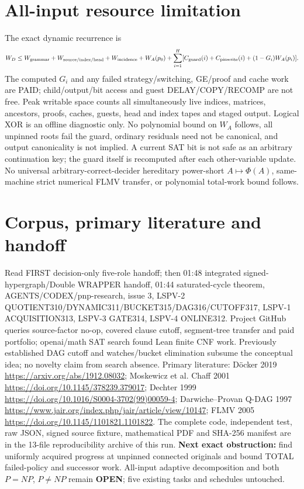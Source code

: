 \documentclass[11pt]{article}
\begin{document}
\section{All-input resource limitation}
The exact dynamic recurrence is
\[
W_D\le W_{\rm grammar}+W_{\rm source/index/head}+W_{\rm incidence}+W_A(p_0)
+\sum_{i=1}^{H}[C_{\rm guard}(i)+C_{\rm pinwrite}(i)+(1-G_i)W_A(p_i)].
\]
The computed $G_i$ and any failed strategy/switching, GE/proof and cache work are PAID; child/output/bit access and guest DELAY/COPY/RECOMP are not free. Peak writable space counts all simultaneously live indices, matrices, ancestors, proofs, caches, guests, head and index tapes and staged output. Logical XOR is an offline diagnostic only. No polynomial bound on $W_A$ follows, all unpinned roots fail the guard, ordinary residuals need not be canonical, and output canonicality is not implied. A current SAT bit is not safe as an arbitrary continuation key; the guard itself is recomputed after each other-variable update. No universal arbitrary-correct-decider hereditary power-short $A\mapsto\Phi(A)$, same-machine strict numerical FLMV transfer, or polynomial total-work bound follows.
\section{Corpus, primary literature and handoff}
Read FIRST decision-only five-role handoff; then 01:48 integrated signed-hypergraph/Double WRAPPER handoff, 01:44 saturated-cycle theorem, AGENTS/CODEX/pnp-research, issue 3, LSPV-2 QUOTIENT310/DYNAMIC311/BUCKET315/DAG316/CUTOFF317, LSPV-1 ACQUISITION313, LSPV-3 GATE314, LSPV-4 ONLINE312. Project GitHub queries source-factor no-op, covered clause cutoff, segment-tree transfer and paid portfolio; openai/math SAT search found Lean finite CNF work. Previously established DAG cutoff and watches/bucket elimination subsume the conceptual idea; no novelty claim from search absence. Primary literature: D\"ocker 2019 \url{https://arxiv.org/abs/1912.08032}; Moskewicz et al. Chaff 2001 \url{https://doi.org/10.1145/378239.379017}; Dechter 1999 \url{https://doi.org/10.1016/S0004-3702(99)00059-4}; Darwiche--Provan Q-DAG 1997 \url{https://www.jair.org/index.php/jair/article/view/10147}; FLMV 2005 \url{https://doi.org/10.1145/1101821.1101822}. The complete code, independent test, raw JSON, signed source fixture, mathematical PDF and SHA-256 manifest are in the 13-file reproducibility archive of this run. \textbf{Next exact obstruction:} find uniformly acquired progress at unpinned connected originals and bound TOTAL failed-policy and successor work. All-input adaptive decomposition and both $P=NP$, $P\ne NP$ remain \textbf{OPEN}; five existing tasks and schedules untouched.
\end{document}
